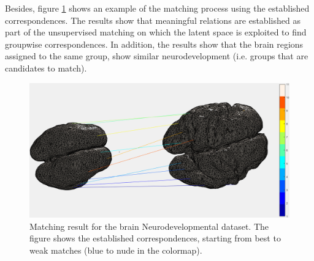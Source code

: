 \documentclass[]{article}
\newcommand{\gD}[2]{\mathcal{N}\left(#1,#2\right)}
\newcommand{\eye}{\mathbf{I}}
\newcommand{\setWv}{\mathbf{W}^{v}}
\newcommand{\setYv}{\mathbf{Y}^{v}}
\newcommand{\setXv}{\mathbf{X}^{v}}
\newcommand{\setZv}{\mathbf{Z}^{v}}
\newcommand{\setFv}{\mathbf{F}^{v}}
\newcommand{\hParams}{\boldsymbol{\theta}}
\begin{document}
Besides, figure \ref{fig:brainBabyM} shows an example of the matching process using the established correspondences. The results show that meaningful relations are established as part of the unsupervised matching on which the latent space is exploited to find groupwise correspondences. In addition, the results show that the brain regions assigned to the same group, show similar neurodevelopment (i.e. groups that are candidates to match).
\begin{figure}[ht!]
	\centering
	
	\includegraphics[width=0.7\linewidth]{img/brainBabyMatch}
	\caption{Matching result for the brain Neurodevelopmental dataset.  The figure shows the established correspondences, starting from best to weak matches (blue to nude in the colormap).}
	\label{fig:brainBabyM}
\end{figure}
%
%
%
%
%
%
%




\end{document}
